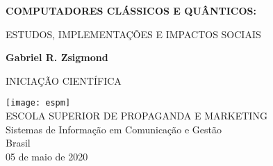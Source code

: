 \begin{titlepage}
    \begin{center}
        \vspace*{1cm}
        \LARGE
        \textbf{COMPUTADORES CLÁSSICOS E QUÂNTICOS:}
        
        \vspace{0.5cm}
        \large
        ESTUDOS, IMPLEMENTAÇÕES E IMPACTOS SOCIAIS
        
        \vspace{1.5cm}
        
        \textbf{Gabriel R. Zsigmond}
        \vfill
        
        INICIAÇÃO CIENTÍFICA
        
        \vspace{0.8cm}
        
        \texttt{[image: espm]}\\
        \large
        ESCOLA SUPERIOR DE PROPAGANDA E MARKETING\\
        Sistemas de Informação em Comunicação e Gestão\\
        Brasil\\
        05 de maio de 2020\\
        
    \end{center}
\end{titlepage}